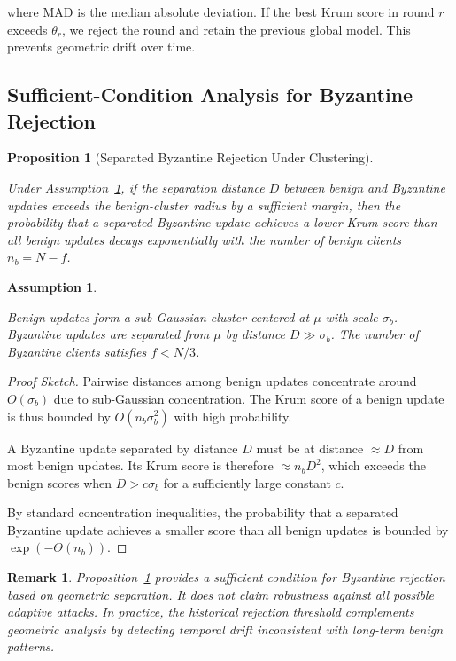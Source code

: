 \documentclass[preprint,12pt]{elsarticle}
\newtheorem{proposition}{Proposition}
\newtheorem{remark}{Remark}
\newtheorem{assumption}{Assumption}
\begin{document}
where MAD is the median absolute deviation. If the best Krum score in round $r$ exceeds $\theta_r$, we reject the round and retain the previous global model. This prevents geometric drift over time.

\subsection{Sufficient-Condition Analysis for Byzantine Rejection}

\begin{proposition}[Separated Byzantine Rejection Under Clustering]
\label{thm:krum_robust}

Under Assumption~\ref{ass:cluster}, if the separation distance $D$ between benign and Byzantine updates exceeds the benign-cluster radius by a sufficient margin, then the probability that a separated Byzantine update achieves a lower Krum score than all benign updates decays exponentially with the number of benign clients $n_b = N - f$.

\end{proposition}

\begin{assumption}
\label{ass:cluster}

Benign updates form a sub-Gaussian cluster centered at $\mu$ with scale $\sigma_b$. Byzantine updates are separated from $\mu$ by distance $D \gg \sigma_b$. The number of Byzantine clients satisfies $f < N/3$.

\end{assumption}

\begin{proof}[Proof Sketch]

Pairwise distances among benign updates concentrate around $O(\sigma_b)$ due to sub-Gaussian concentration. The Krum score of a benign update is thus bounded by $O(n_b \sigma_b^2)$ with high probability.

A Byzantine update separated by distance $D$ must be at distance $\approx D$ from most benign updates. Its Krum score is therefore $\approx n_b D^2$, which exceeds the benign scores when $D > c \sigma_b$ for a sufficiently large constant $c$.

By standard concentration inequalities, the probability that a separated Byzantine update achieves a smaller score than all benign updates is bounded by $\exp(-\Theta(n_b))$.

\end{proof}

\begin{remark}

Proposition~\ref{thm:krum_robust} provides a sufficient condition for Byzantine rejection based on geometric separation. It does not claim robustness against all possible adaptive attacks. In practice, the historical rejection threshold complements geometric analysis by detecting temporal drift inconsistent with long-term benign patterns.

\end{remark}
\end{document}
